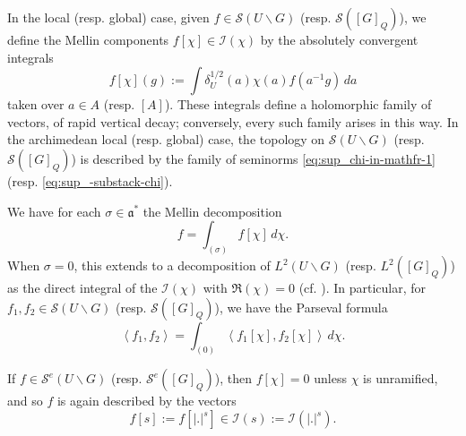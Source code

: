 \documentclass[reqno]{amsart}
\theoremstyle{plain} \newtheorem{theorem} {Theorem}
\theoremstyle{definition} \newtheorem{definition} [theorem] {Definition}
\theoremstyle{itplain} %
\numberwithin{equation}{section}
\numberwithin{theorem}{section}
\begin{document}
In the local (resp. global) case, given $f \in \mathcal{S}(U \backslash G)$ (resp. $\mathcal{S}([G]_Q)$), we define the Mellin components $f[\chi] \in \mathcal{I}(\chi)$ by the absolutely convergent integrals 
\begin{equation*}
  f[\chi](g) := \int \delta_U^{1/2}(a)  \chi(a) f(a^{-1} g) \, d a
\end{equation*}
taken over $a \in A$ (resp. $[A]$).  These integrals define a holomorphic family of vectors, of rapid vertical decay; conversely, every such family arises in this way.  In the archimedean local (resp. global) case, the topology on $\mathcal{S}(U \backslash G)$ (resp. $\mathcal{S}([G]_Q)$) is described by the family of seminorms \eqref{eq:sup_chi-in-mathfr-1} (resp. \eqref{eq:sup_-substack-chi}).

We have for each $\sigma \in \mathfrak{a}^*$ the Mellin decomposition
\begin{equation}\label{eq:f-=-int}
  f = \int _{(\sigma)} f[\chi] \, d \chi.
\end{equation}
When $\sigma = 0$, this extends to a decomposition of $L^2(U \backslash G)$ (resp. $L^2([G]_Q)$) as the direct integral of the $\mathcal{I}(\chi)$ with $\Re(\chi) = 0$ (cf. \cite[\S3.4.9, \S3.5.2]{MR3468638}).  In particular, for $f_1, f_2 \in \mathcal{S}(U \backslash G)$ (resp. $\mathcal{S}([G]_Q)$), we have the Parseval formula
\begin{equation}\label{eq:leftlangle-f_1-f_2}
  \left\langle f_1, f_2 \right\rangle
  =
  \int _{(0)}
  \left\langle f_1[\chi], f_2[\chi] \right\rangle \, d \chi.
\end{equation}

If $f \in \mathcal{S}^e(U \backslash G)$ (resp. $\mathcal{S}^e([G]_Q)$), then $f[\chi] = 0$ unless $\chi$ is unramified, and so $f$ is again described by the vectors
\begin{equation*}
  f[s] := f[|.|^s] \in
  \mathcal{I}(s) := \mathcal{I} (|.|^s).
\end{equation*}
\end{document}
